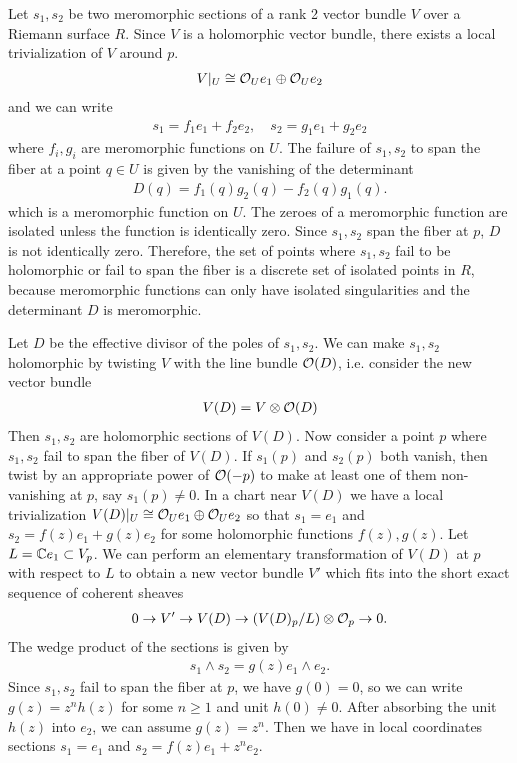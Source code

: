 \documentclass[12pt]{article}  %
\begin{document}
\begin{solution}
    Let $s_1, s_2$ be two meromorphic sections of a rank 2 vector bundle $V$ over a Riemann surface $R$. Since $V$ is a holomorphic vector bundle, there exists a local trivialization of $V$ around $p$. \begin{align*}
        V|_U \cong {\mathcal{O}}_U e_1 \oplus {\mathcal{O}}_U e_2
    \end{align*} and we can write \begin{align*}
        s_1 = f_1 e_1 + f_2 e_2, \quad s_2 = g_1 e_1 + g_2 e_2
    \end{align*} where $f_i, g_i$ are meromorphic functions on $U$. The failure of $s_1, s_2$ to span the fiber at a point $q \in U$ is given by the vanishing of the determinant \begin{align*}
        D(q) = f_1(q)g_2(q) - f_2(q)g_1(q).
    \end{align*} which is a meromorphic function on $U$. The zeroes of a meromorphic function are isolated unless the function is identically zero. Since $s_1, s_2$ span the fiber at $p$, $D$ is not identically zero. Therefore, the set of points where $s_1, s_2$ fail to be holomorphic or fail to span the fiber is a discrete set of isolated points in $R$, because meromorphic functions can only have isolated singularities and the determinant $D$ is meromorphic.

    Let $D$ be the effective divisor of the poles of $s_1, s_2$. We can make $s_1, s_2$ holomorphic by twisting $V$ with the line bundle ${\mathcal{O}}(D)$, i.e. consider the new vector bundle \begin{align*}
        V(D) = V \otimes {\mathcal{O}}(D)\end{align*} Then $s_1, s_2$ are holomorphic sections of $V(D)$. Now consider a point $p$ where $s_1, s_2$ fail to span the fiber of $V(D)$. If $s_1(p)$ and $s_2(p)$ both vanish, then twist by an appropriate power of ${\mathcal{O}}(-p)$ to make at least one of them non-vanishing at $p$, say $s_1(p) \neq 0$. In a chart near $V(D)$ we have a local trivialization $V(D)|_U \cong {\mathcal{O}}_U e_1 \oplus {\mathcal{O}}_U e_2$ so that $s_1 = e_1$ and $s_2 = f(z)e_1 + g(z)e_2$ for some holomorphic functions $f(z), g(z)$. Let $L = \mathbb{C} e_1 \subset V_p$. We can perform an elementary transformation of $V(D)$ at $p$ with respect to $L$ to obtain a new vector bundle $V'$ which fits into the short exact sequence of coherent sheaves \begin{align}
        0 \to V' \to V(D) \to (V(D)_p/L) \otimes {\mathcal{O}}_p \to 0.
    \end{align} 
    The wedge product of the sections is given by \begin{align*}
        s_1 \wedge s_2 = g(z) e_1 \wedge e_2.
    \end{align*} Since $s_1, s_2$ fail to span the fiber at $p$, we have $g(0) = 0$, so we can write $g(z) = z^n h(z)$ for some $n \geq 1$ and unit $h(0) \neq 0$. After absorbing the unit $h(z)$ into $e_2$, we can assume $g(z) = z^n$. Then we have in local coordinates sections $s_1 = e_1$ and $s_2 = f(z) e_1 + z^n e_2$. 
    

\end{solution}
\end{document}
